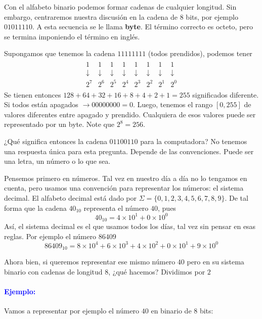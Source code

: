 \documentclass[12pt]{article}
\begin{document}
Con el alfabeto binario podemos formar cadenas de cualquier longitud. Sin embargo, 
centraremos nuestra discusión en la cadena de 8 bits, por ejemplo $01011110$. 
A esta secuencia se le llama \textbf{byte}. El término correcto es octeto, pero se termina 
imponiendo el término en inglés.

Supongamos que tenemos la cadena $11111111$ (todos prendidos), podemos tener
\begin{align*}
\begin{matrix}
1 & 1 & 1 & 1 & 1 & 1 & 1 & 1 \\
\downarrow & \downarrow & \downarrow & \downarrow & \downarrow & \downarrow & \downarrow & \downarrow \\
2^7 & 2^6 & 2^5 & 2^4 & 2^3 & 2^2 & 2^1 & 2^0
\end{matrix}
\end{align*}
Se tienen entonces $ 128 + 64 + 32 + 16 + 8 + 4 + 2 + 1 = 255$ significados diferente.
Si todos están apagados $\rightarrow 00000000 = 0$. Luego, tenemos el rango $[0,255]$ 
de valores diferentes entre apagado y prendido. Cualquiera de esos valores puede ser
representado por un byte. Note que $2^8 = 256$.

¿Qué significa entonces la cadena $01100110$ para la computadora? No tenemos una respuesta 
única para esta pregunta. Depende de las convenciones. Puede ser una letra, un número o 
lo que sea. 

Pensemos primero en números. Tal vez en nuestro día a día no lo tengamos en 
cuenta, pero usamos una convención para representar los números: el sistema decimal.
El alfabeto decimal está dado por $\Sigma = \{0, 1, 2, 3, 4, 5, 6, 7, 8, 9\}$.  
De tal forma que la cadena $40_{10}$ representa el número $40$, 
pues 
$$40_{10} = 4\times 10^1 + 0 \times 10^0$$ 
Así, el sistema decimal es el que usamos
todos los días, tal vez sin pensar en esas reglas. Por ejemplo el número $86409$
$$86409_{10} = 8\times 10^4 + 6\times 10^3 + 4\times 10^2+ 0\times 10^1+ 9\times 10^0$$ 

Ahora bien, si queremos representar ese mismo número $40$ pero en su sistema 
binario con cadenas de longitud $8$, ¿qué hacemos? Dividimos por $2$

\paragraph{\textcolor{blue}{Ejemplo:}} Vamos a representar por ejemplo el número $40$ 
en binario de $8$ bits:
\end{document}
